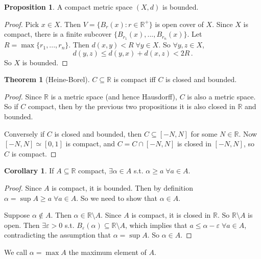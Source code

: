 \documentclass[a4paper,11pt]{article}
\theoremstyle{definition}
\newtheorem*{prop}{Proposition}
\newtheorem*{thm}{Theorem}
\newtheorem*{cor}{Corollary}
\numberwithin{equation}{section}
\begin{document}
\begin{prop}
    A compact metric space $(X,d)$ is bounded.
\end{prop}

\begin{proof}
    Pick $x\in X$. Then $V=\{B_r(x):r\in\mathbb{R}^+\}$ is open cover of $X$. Since $X$ is compact, there is a finite subcover $\{B_{r_1}(x),...,B_{r_n}(x)\}$. Let $R=\max\{r_1,...,r_n\}$. Then $d(x,y)<R\;\forall y\in X$. So $\forall y,z\in X$, 
    \begin{equation}
        d(y,z)\leq d(y,x)+d(x,z) <2R\,.
    \end{equation}
    So $X$ is bounded.
\end{proof}

\begin{thm}[Heine-Borel]
$C\subseteq\mathbb{R}$ is compact iff $C$ is closed and bounded.
\end{thm}

\begin{proof}
    Since $\mathbb{R}$ is a metric space (and hence Hausdorff), $C$ is also a metric space. So if $C$ compact, then by the previous two propositions it is also closed in $\mathbb{R}$ and bounded.
    
    Conversely if $C$ is closed and bounded, then $C\subseteq[-N,N]$ for some $N\in\mathbb{R}$. Now $[-N,N]\simeq[0,1]$ is compact, and $C=C\cap[-N,N]$ is closed in $[-N,N]$, so $C$ is compact.
\end{proof}

\begin{cor}
If $A\subseteq\mathbb{R}$ compact, $\exists\alpha\in A$ s.t. $\alpha\geq a\;\forall a\in A$.
\end{cor}

\begin{proof}
    Since $A$ is compact, it is bounded. Then by definition $\alpha=\sup A\geq a\;\forall a\in A$. So we need to show that $\alpha\in A$.
    
    Suppose $\alpha\notin A$. Then $\alpha\in\mathbb{R}\setminus A$. Since $A$ is compact, it is closed in $\mathbb{R}$. So $\mathbb{R}\setminus A$ is open. Then $\exists\varepsilon>0$ s.t. $B_\varepsilon(\alpha)\subseteq\mathbb{R}\setminus A$, which implies that $a\leq\alpha-\varepsilon\;\forall a\in A$, contradicting the assumption that $\alpha=\sup A$. So $\alpha\in A$.
\end{proof}

We call $\alpha=\max A$ the maximum element of $A$.
\end{document}
